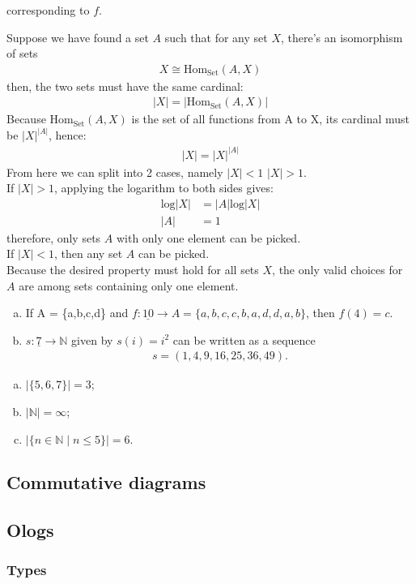 \documentclass[12pt]{article}
\theoremstyle{remark}
\theoremstyle{definition}
\def\sexc{\begin{enumerate}[a.)]\setlength{\itemsep}{.1cm}\setlength{\parskip}{.1cm}\item}
\def\next{\item}
\def\endsexc{\end{enumerate}}
\begin{document}
\begin{large}
\begin{Exercise}
\end{Exercise} corresponding to $f$.
\begin{Exercise}
Suppose we have found a set $A$ such that for any set $X$, there's an isomorphism of sets
\begin{align*}X \cong \text{Hom}_\text{Set}(A,X)
\end{align*}
then, the two sets must have the same cardinal:
\begin{align*}|X| = |\text{Hom}_\text{Set}(A,X)|
\end{align*}
Because $\text{Hom}_\text{Set}(A,X)$ is the set of all functions from A to X, its cardinal must be $|X|^{|A|}$, hence:
\begin{align*}
|X| = |X|^{|A|}
\end{align*}
From here we can split into 2 cases, namely $|X|<1$  $|X|>1$.\\
If $|X|>1$, applying the logarithm to both sides gives:
\begin{align*}
\text{log}|X| &= |A|{\text{log}|X|}\\
 |A| &= 1
\end{align*}
therefore, only sets $A$ with only one element can be picked.\\
If $|X|<1$, then any set $A$ can be picked.\\
Because the desired property must hold for all sets $X$, the only valid choices for $A$ are among sets containing only one element.
\end{Exercise}
\begin{Exercise}
\sexc
If A = \{a,b,c,d\} and $f:\underline{10}\rightarrow A = \{a,b,c,c,b,a,d,d,a,b\}$, then $f(4)=c$.
\next
$s:\underline{7}\rightarrow\mathbb{N}$ given by $s(i)=i^2$ can be written as a sequence 
\begin{align*}
s =(1,4,9,16,25,36,49).
\end{align*}
\endsexc
\end{Exercise}
\begin{Exercise}
\sexc
$|\{5,6,7\}|=3$;
\next
$|\mathbb{N}|=\infty$;
\next 
$|\{n \in \mathbb{N} \mid n \leq 5\}| = 6.$
\endsexc
\end{Exercise}
\subsection{Commutative diagrams}
\subsection{Ologs}
\subsubsection{Types}

\end{large}
\end{document}
